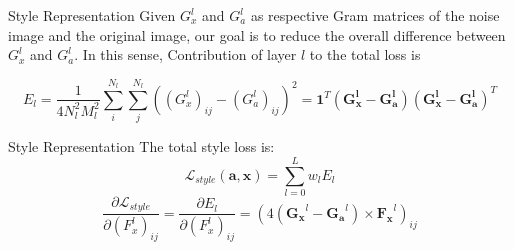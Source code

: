\documentclass{beamer}
\begin{document}
\begin{frame}{Style Representation}
Given $G_x^l$ and $G_a^l$ as respective Gram matrices of the noise image and
the original image, our goal is to reduce the overall difference between
$G_x^l$ and $G_a^l$. In this sense, Contribution of layer $l$ to the total
loss is

\begin{equation}
    E_l = \frac{1}{4N_l^2M_l^2} \sum_{i}^{N_l}\sum_{j}^{N_l}{((G^l_x)_{ij} - (G_a^l)_{ij})^2}
    = \mathbf{1}^T(\mathbf{G^l_x} - \mathbf{G^l_a})(\mathbf{G^l_x} - \mathbf{G^l_a})^T
\end{equation}

\end{frame}



\begin{frame}{Style Representation}
The total style loss is:
\begin{equation}
    \mathcal{L}_{style}(\mathbf{a}, \mathbf{x}) = \sum_{l=0}^L {w_l E_l }
\end{equation}
\begin{equation}
    \frac{\partial \mathcal{L}_{style}}{\partial (F_x^l)_{ij}} = \frac{\partial E_l}{\partial (F^l_x)_{ij}} =
    (4(\mathbf{G_x}^l - \mathbf{G_a}^l) \times \mathbf{F_x}^l)_{ij}
\end{equation}
\end{frame}
\end{document}
